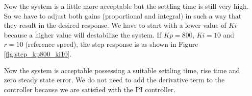 \documentclass[paper=letter, fontsize=11pt]{scrartcl}
\numberwithin{equation}{section}
\numberwithin{figure}{section}
\numberwithin{table}{section}
\begin{document}
\par
Now the system is a little more acceptable but the settling time is still
very high.
So we have to adjust both gains (proportional and integral) in such a way
that they result in the desired response. We have to start with a lower value of
$Ki$ because a higher value will destabilize the system. If $Kp = 800$,
$Ki=10$ and $r=10$ (reference speed), the step response is as shown in Figure
\ref{fig:step_kp800_ki10}.

\par
Now the system is acceptable possessing a suitable settling time, rise
time and zero steady state error. We do not need to add the derivative term
to the controller because we are satisfied with the PI controller.
\end{document}

